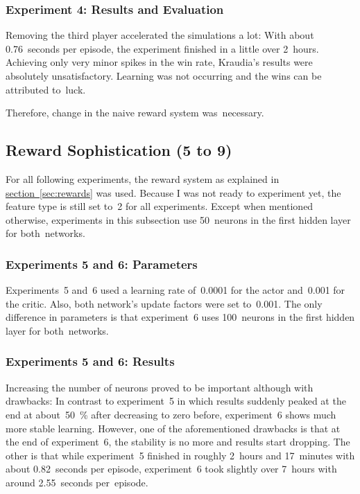 \documentclass[a4paper,titlepage]{article}
\begin{document}
\subsubsection*{Experiment 4: Results and Evaluation}

Removing the third player accelerated the simulations a lot: With about 0.76~seconds per episode, the experiment finished in a little over 2~hours. Achieving only very minor spikes in the win rate, Kraudia's results were absolutely unsatisfactory. Learning was not occurring and the wins can be attributed to~luck. \medskip

Therefore, change in the naive reward system was~necessary.

\subsection{Reward Sophistication (5 to 9)}

For all following experiments, the reward system as explained in \hyperref[sec:rewards]{section~\ref*{sec:rewards}} was used. Because I was not ready to experiment yet, the feature type is still set to~2 for all experiments. Except when mentioned otherwise, experiments in this subsection use 50~neurons in the first hidden layer for both~networks.

\subsubsection*{Experiments 5 and 6: Parameters}

Experiments~5 and~6 used a learning rate of~0.0001 for the actor and~0.001 for the critic. Also, both network's update factors were set to~0.001. The only difference in parameters is that experiment~6 uses 100~neurons in the first hidden layer for both~networks.

\subsubsection*{Experiments 5 and 6: Results}

Increasing the number of neurons proved to be important although with drawbacks: In contrast to experiment~5 in which results suddenly peaked at the end at about~50~\% after decreasing to zero before, experiment~6 shows much more stable learning. However, one of the aforementioned drawbacks is that at the end of experiment~6, the stability is no more and results start dropping. The other is that while experiment~5 finished in roughly 2~hours and 17~minutes with about 0.82~seconds per episode, experiment~6 took slightly over 7~hours with around 2.55~seconds per~episode.
\end{document}
